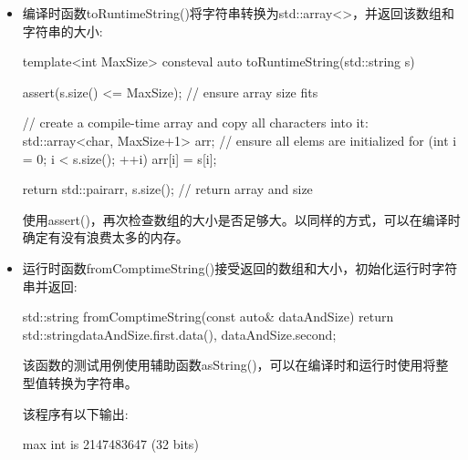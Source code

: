 \begin{itemize}
\item
编译时函数toRuntimeString()将字符串转换为std::array<>，并返回该数组和字符串的大小:

\begin{cpp}
template<int MaxSize>
consteval auto toRuntimeString(std::string s)
{
	assert(s.size() <= MaxSize); // ensure array size fits

	// create a compile-time array and copy all characters into it:
	std::array<char, MaxSize+1> arr{}; // ensure all elems are initialized
	for (int i = 0; i < s.size(); ++i) {
		arr[i] = s[i];
	}

	return std::pair{arr, s.size()}; // return array and size
}
\end{cpp}

使用assert()，再次检查数组的大小是否足够大。以同样的方式，可以在编译时确定有没有浪费太多的内存。

\item
运行时函数fromComptimeString()接受返回的数组和大小，初始化运行时字符串并返回:

\begin{cpp}
std::string fromComptimeString(const auto& dataAndSize)
{
	return std::string{dataAndSize.first.data(),
					   dataAndSize.second};
}
\end{cpp}

该函数的测试用例使用辅助函数asString()，可以在编译时和运行时使用将整型值转换为字符串。

该程序有以下输出:

\begin{shell}
max int is 2147483647 (32 bits)
\end{shell}

\end{itemize}







